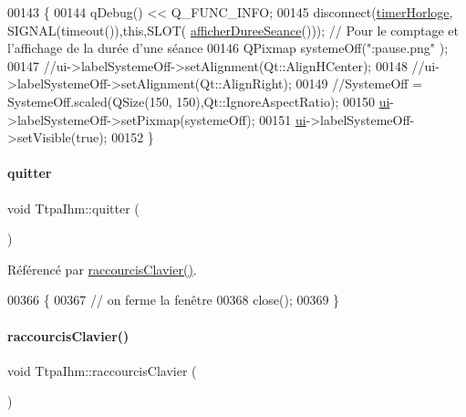 \begin{DoxyCode}
00143 \{
00144     qDebug() << Q\_FUNC\_INFO;
00145     disconnect(\hyperlink{class_ttpa_ihm_a447ad7262efa01d22bc3222e0e470087}{timerHorloge}, SIGNAL(timeout()),\textcolor{keyword}{this},SLOT(
      \hyperlink{class_ttpa_ihm_a266897eb263e584b40fc2b7c26347623}{afficherDureeSeance}())); \textcolor{comment}{// Pour le comptage et l'affichage de la durée d'une séance}
00146     QPixmap systemeOff(\textcolor{stringliteral}{":pause.png"} );
00147     \textcolor{comment}{//ui->labelSystemeOff->setAlignment(Qt::AlignHCenter);}
00148     \textcolor{comment}{//ui->labelSystemeOff->setAlignment(Qt::AlignRight);}
00149     \textcolor{comment}{//SystemeOff = SystemeOff.scaled(QSize(150, 150),Qt::IgnoreAspectRatio);}
00150     \hyperlink{class_ttpa_ihm_ad5fae1222a667da158c26f3d0f0dce23}{ui}->labelSystemeOff->setPixmap(systemeOff);
00151     \hyperlink{class_ttpa_ihm_ad5fae1222a667da158c26f3d0f0dce23}{ui}->labelSystemeOff->setVisible(\textcolor{keyword}{true});
00152 \}
\end{DoxyCode}
\mbox{\label{class_ttpa_ihm_af14988cbed7051af4eba326123cfb177}} 
\paragraph{\texorpdfstring{quitter}{quitter}}
{\footnotesize\ttfamily void Ttpa\+Ihm\+::quitter (\begin{DoxyParamCaption}{ }\end{DoxyParamCaption})\hspace{0.3cm}{\ttfamily [slot]}}



Référencé par \hyperlink{class_ttpa_ihm_a9d649ace50425bdc2bea311753b4214c}{raccourcis\+Clavier()}.


\begin{DoxyCode}
00366 \{
00367     \textcolor{comment}{// on ferme la fenêtre}
00368     close();
00369 \}
\end{DoxyCode}
\mbox{\label{class_ttpa_ihm_a9d649ace50425bdc2bea311753b4214c}} 
\paragraph{\texorpdfstring{raccourcis\+Clavier()}{raccourcisClavier()}}
{\footnotesize\ttfamily void Ttpa\+Ihm\+::raccourcis\+Clavier (\begin{DoxyParamCaption}{ }\end{DoxyParamCaption})\hspace{0.3cm}{\ttfamily [private]}}



